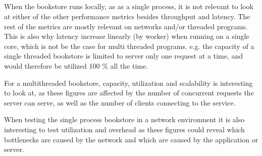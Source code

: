 \documentclass[a4paper, 11pt]{article}
\begin{document}
\subsection{} %

When the bookstore runs locally, as as a single process, it is not 
relevant to look at either of the other performance metrics besides throughput
and latency. The rest of the metrics are mostly relevant on networks and/or
threaded programs. This is also why latency increase linearly (by worker) when
running on a single core, which is not be the case for multi threaded programs.
e.g. the capacity of a single threaded bookstore is limited to server only one
request at a time, and would therefore be utilized 100 \% all the time.

For a multithreaded bookstore, capacity, utilization and scalability is
interesting to look at, as these figures are affected by the number of
concurrent requests the server can serve, as well as the number of clients
connecting to the service.

When testing the single process bookstore in a network environment it is also
interesting to test utilization and overhead as these figures could reveal
which bottlenecks are caused by the network and which are caused by the
application or server.


\end{document}
